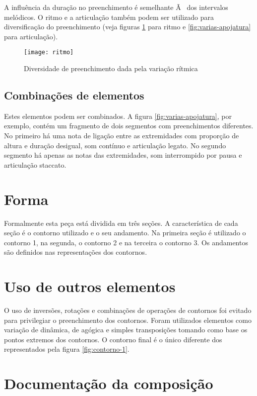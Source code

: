 \documentclass[12pt]{article}
\begin{document}
A influência da duração no preenchimento é semelhante Ã  dos intervalos
melódicos. O ritmo e a articulação também podem ser utilizado para
diversificação do preenchimento (veja figuras \ref{fig:ritmo} para
ritmo e \ref{fig:varias-apojatura} para articulação).

\begin{figure}[h]
  \centering
  \texttt{[image: ritmo]}
  \caption{Diversidade de preenchimento dada pela variação rítmica}
  \label{fig:ritmo}
\end{figure}

\subsection{Combinações de elementos}
\label{sec:comb-de-elem}

Estes elementos podem ser combinados. A figura
\ref{fig:varias-apojatura}, por exemplo, contém um fragmento de dois
segmentos com preenchimentos diferentes. No primeiro há uma nota de
ligação entre as extremidades com proporção de altura e duração
desigual, som contínuo e articulação legato. No segundo segmento há
apenas as notas das extremidades, som interrompido por pausa e
articulação staccato.

\section{Forma}
\label{sec:forma}

Formalmente esta peça está dividida em três seções. A característica
de cada seção é o contorno utilizado e o seu andamento. Na primeira
seção é utilizado o contorno 1, na segunda, o contorno 2 e na terceira
o contorno 3. Os andamentos são definidos nas representações dos
contornos.

\section{Uso de outros elementos}
\label{sec:uso-de-outros}

O uso de inversões, rotações e combinações de operações de contornos
foi evitado para privilegiar o preenchimento dos contornos. Foram
utilizados elementos como variação de dinâmica, de agógica e simples
transposições tomando como base os pontos extremos dos contornos. O
contorno final é o único diferente dos representados pela figura
\ref{fig:contorno-1}.

\section{Documentação da composição}
\label{sec:docum-da-comp}
\end{document}
